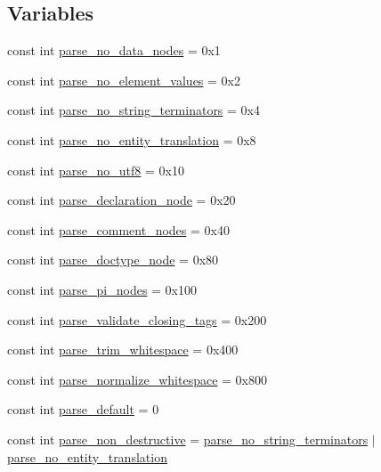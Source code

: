 \subsection*{Variables}
\begin{DoxyCompactItemize}
\item 
const int \hyperlink{namespacerapidxml_ac2d21ef14a4e8936b94aca5d38b1a74d}{parse\+\_\+no\+\_\+data\+\_\+nodes} = 0x1
\item 
const int \hyperlink{namespacerapidxml_a00e6fea134b786ea6efeed1c8bc4a668}{parse\+\_\+no\+\_\+element\+\_\+values} = 0x2
\item 
const int \hyperlink{namespacerapidxml_af3fc88ba6bee33482a2db81b1da36ea1}{parse\+\_\+no\+\_\+string\+\_\+terminators} = 0x4
\item 
const int \hyperlink{namespacerapidxml_a89113c103ffaf77615d1aa330c8dcca8}{parse\+\_\+no\+\_\+entity\+\_\+translation} = 0x8
\item 
const int \hyperlink{namespacerapidxml_a22d4aefaceb00d7afabfef7107b108da}{parse\+\_\+no\+\_\+utf8} = 0x10
\item 
const int \hyperlink{namespacerapidxml_a999d782659513f8015ea4236e3204c42}{parse\+\_\+declaration\+\_\+node} = 0x20
\item 
const int \hyperlink{namespacerapidxml_ae093dd49e2f59fa39eee95f1a6568e32}{parse\+\_\+comment\+\_\+nodes} = 0x40
\item 
const int \hyperlink{namespacerapidxml_a41002b49780a90a0bbcc28ce8b895fe4}{parse\+\_\+doctype\+\_\+node} = 0x80
\item 
const int \hyperlink{namespacerapidxml_a03fe68fcf5d28f38476e0fd31adecc4c}{parse\+\_\+pi\+\_\+nodes} = 0x100
\item 
const int \hyperlink{namespacerapidxml_a7ce8f40fda68338e20b56f41e48e49f3}{parse\+\_\+validate\+\_\+closing\+\_\+tags} = 0x200
\item 
const int \hyperlink{namespacerapidxml_a61912424b47db5038e726d4e1c22417f}{parse\+\_\+trim\+\_\+whitespace} = 0x400
\item 
const int \hyperlink{namespacerapidxml_a31f33885defb5176a7d99e524c35d386}{parse\+\_\+normalize\+\_\+whitespace} = 0x800
\item 
const int \hyperlink{namespacerapidxml_acf4edf952f59eb1b6124ea37ad7da3ab}{parse\+\_\+default} = 0
\item 
const int \hyperlink{namespacerapidxml_a45d4d8fef551beaaba23a83b847fd6a3}{parse\+\_\+non\+\_\+destructive} = \hyperlink{namespacerapidxml_af3fc88ba6bee33482a2db81b1da36ea1}{parse\+\_\+no\+\_\+string\+\_\+terminators} $\vert$ \hyperlink{namespacerapidxml_a89113c103ffaf77615d1aa330c8dcca8}{parse\+\_\+no\+\_\+entity\+\_\+translation}

\end{DoxyCompactItemize}
